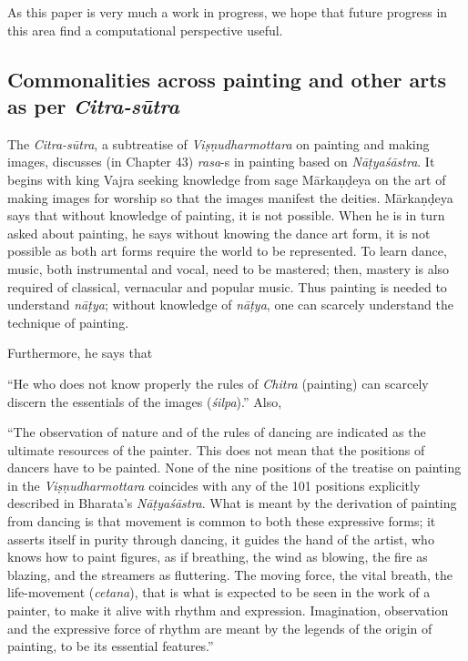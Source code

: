 As this paper is very much a work in progress, we hope that future progress in this area find a computational perspective useful.

\subsection{Commonalities across painting and other arts as per \textsl{Citra-sūtra}}\label{chap3-sec1.3}

The \textsl{Citra-sūtra}, a subtreatise of \textsl{Viṣṇudharmottara} on painting and making images, discusses (in Chapter 43) \textsl{rasa}-s in painting based on \textsl{Nāṭyaśāstra}. It begins with king Vajra seeking knowledge from sage Mārkaṇḍeya on the art of making images for worship so that the images manifest the deities. Mārkaṇḍeya says that without knowledge of painting, it is not possible. When he is in turn asked about painting, he says without knowing the dance art form, it is not possible as both art forms require the world to be represented. To learn dance, music, both instrumental and vocal, need to be mastered; then, mastery is also required of classical, vernacular and popular music. Thus painting is needed to understand \textsl{nāṭya}; without knowledge of \textsl{nāṭya}, one can scarcely understand the technique of painting. 

Furthermore, he says that

\begin{myquote}
“He who does not know properly the rules of \textsl{Chitra} (painting) can scarcely discern the essentials of the images (\textsl{śilpa}).” Also, 

“The observation of nature and of the rules of dancing are indicated as the ultimate resources of the painter. This does not mean that the positions of dancers have to be painted. None of the nine positions of the treatise on painting in the \textsl{Viṣṇudharmottara} coincides with any of the 101 positions explicitly described in Bharata's \textsl{Nāṭyaśāstra}. What is meant by the derivation of painting from dancing is that movement is common to both these expressive forms; it asserts itself in purity through dancing, it guides the hand of the artist, who knows how to paint figures, as if breathing, the wind as blowing, the fire as blazing, and the streamers as fluttering. The moving force, the vital breath, the life-movement (\textsl{cetana}), that is what is expected to be seen in the work of a painter, to make it alive with rhythm and expression. Imagination, observation and the expressive force of rhythm are meant by the legends of the origin of painting, to be its essential features.” 
\end{myquote}

